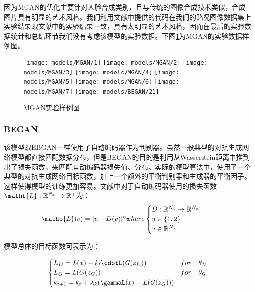 因为MGAN的优化主要针对人脸合成类别，且与传统的图像合成技术类似，合成图片具有明显的艺术风格。我们利用文献中提供的代码\cite{git:mgan}在我们的路况图像数据集上实验结果跟文献中的实验结果一致，具有太明显的艺术风格，因而在最后的实验数据统计和总结环节我们没有考虑该模型的实验数据。下图\ref{fig:mag}为MGAN的实验数据样例图。

\begin{figure}[h] 
    \centering
    \texttt{[image: models/MGAN/1]}
    \texttt{[image: models/MGAN/2]}
    \texttt{[image: models/MGAN/3]}
    \texttt{[image: models/MGAN/4]}
    \texttt{[image: models/MGAN/5]}
    \texttt{[image: models/MGAN/6]}
    \texttt{[image: models/MGAN/7]}
    \texttt{[image: models/BEGAN/21]}
    \caption{MGAN实验样例图}
    \label{fig:mag}
\end{figure}

\subsubsection{BEGAN}

  该模型跟EBGAN\cite{ebgan}一样使用了自动编码器作为判别器。虽然一般典型的对抗生成网络模型都直接匹配数据分布，但是BEGAN的目的是利用从Wasserstein距离中推到出了损失函数，来匹配自动编码器损失值。分布。实际的模型算法中，使用了一个典型的对抗生成网络目标函数，加上一个额外的平衡判别器和生成器的平衡因子。这样使得模型的训练更加容易。文献\cite{BEGAN}中对于自动编码器使用的损失函数$\mathb{L}:\mathbb{R}^{N_x}\to \mathbb{R}^+$为：
\begin{align}
    \mathb{L}(v) = |v-D(v)|^\eta where \begin{cases}
        D: \mathbb{R}^{N_x}\to \mathbb{R}^{N_x} \quad  \\
        \eta \in \{1,2\} \quad  \\
        v \in \mathbb{R}^{N_x} 
    \end{cases}
\end{align}

模型总体的目标函数可表示为：

\begin{align}
    \begin{cases}
        L_D = L(x) - k_t\cdotL(G(z_D)) & for \quad \theta_D \\
        L_G = L(G(z_G)) & for \quad \theta_G \\
        k_{t+1} = k_t + \lambda_k(\gammaL(x)-L(G(z_G))) 
    \end{cases}  
\end{align}

